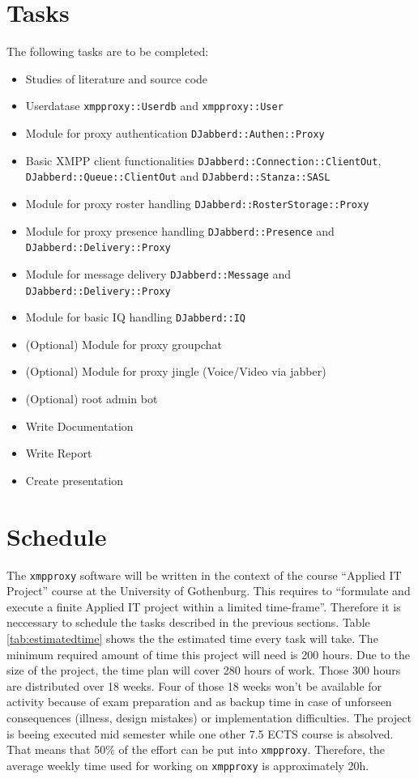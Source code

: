 \documentclass[a4paper,10pt,numbers=noendperiod]{scrartcl}
\begin{document}
\section{Tasks}
The following tasks are to be completed:
\begin{itemize}
	\item Studies of literature and source code
	\item Userdatase \texttt{xmpproxy::Userdb} and \texttt{xmpproxy::User}
	\item Module for proxy authentication \texttt{DJabberd::Authen::Proxy}
	\item Basic XMPP client functionalities \texttt{DJabberd::Connection::ClientOut}, \texttt{DJabberd::Queue::ClientOut} and \texttt{DJabberd::Stanza::SASL}
	\item Module for proxy roster handling \texttt{DJabberd::RosterStorage::Proxy}
	\item Module for proxy presence handling \texttt{DJabberd::Presence} and \texttt{DJabberd::Delivery::Proxy}
	\item Module for message delivery \texttt{DJabberd::Message} and \texttt{DJabberd::Delivery::Proxy}
	\item Module for basic IQ handling \texttt{DJabberd::IQ}
	\item (Optional) Module for proxy groupchat 
	\item (Optional) Module for proxy jingle (Voice/Video via jabber)	
	\item (Optional) root admin bot                                  
	\item Write Documentation	
	\item Write Report
	\item Create presentation
\end{itemize}

\newpage
\section{Schedule}
The \texttt{xmpproxy} software will be written in the context of the course ``Applied IT Project'' course at the University of Gothenburg. This requires to ``formulate and execute a finite Applied IT project within a limited time-frame''. 
Therefore it is neccessary to schedule the tasks described in the previous sections. 
Table \ref{tab:estimatedtime} shows the the estimated time every task will take. The minimum required amount of time this project will need is 200 hours. Due to the size of the project, the time plan will cover 280 hours of work. Those 300 hours are distributed over 18 weeks. Four of those 18 weeks won't be available for activity because of exam preparation and as backup time in case of unforseen consequences (illness, design mistakes) or implementation difficulties. The project is beeing executed mid semester while one other 7.5 ECTS course is absolved. That means that 50\% of the effort can be put into \texttt{xmpproxy}. Therefore, the average weekly time used for working on \texttt{xmpproxy} is approximately 20h.
\end{document}
